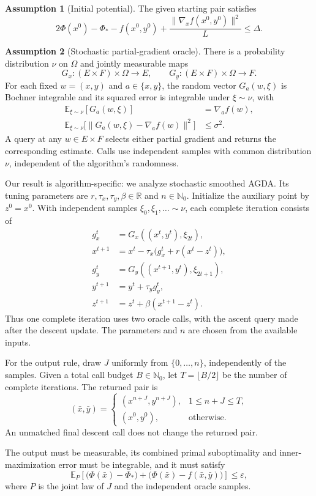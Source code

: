 \documentclass[10pt]{article}
\theoremstyle{definition}
\newtheorem{assumption}{Assumption}
\begin{document}
\begin{assumption}[Initial potential]
The given starting pair satisfies
\[
2\Phi(x^0)-\Phi_*-f(x^0,y^0)
+\frac{\|\nabla_x f(x^0,y^0)\|^2}{L}
\leq\Delta.
\]
\end{assumption}

\begin{assumption}[Stochastic partial-gradient oracle]
There is a probability distribution $\nu$ on $\Omega$ and jointly measurable maps
\[
G_x:(E\times F)\times\Omega\to E,
\qquad
G_y:(E\times F)\times\Omega\to F.
\]
For each fixed $w=(x,y)$ and $a\in\{x,y\}$, the random vector $G_a(w,\xi)$ is Bochner integrable and its squared error is integrable under $\xi\sim\nu$, with
\[
\begin{aligned}
\mathbb{E}_{\xi\sim\nu}[G_a(w,\xi)]&=\nabla_a f(w),\\
\mathbb{E}_{\xi\sim\nu}
\bigl[\|G_a(w,\xi)-\nabla_a f(w)\|^2\bigr]&\leq\sigma^2.
\end{aligned}
\]
A query at any $w\in E\times F$ selects either partial gradient and returns the corresponding estimate. Calls use independent samples with common distribution $\nu$, independent of the algorithm's randomness.
\end{assumption}

Our result is algorithm-specific: we analyze stochastic smoothed AGDA. Its tuning parameters are $r,\tau_x,\tau_y,\beta\in\mathbb{R}$ and $n\in\mathbb{N}_0$. Initialize the auxiliary point by $z^0=x^0$. With independent samples $\xi_0,\xi_1,\ldots\sim\nu$, each complete iteration consists of
\[
\begin{aligned}
g_x^t&=G_x((x^t,y^t),\xi_{2t}),\\
x^{t+1}&=x^t-\tau_x\bigl(g_x^t+r(x^t-z^t)\bigr),\\
g_y^t&=G_y((x^{t+1},y^t),\xi_{2t+1}),\\
y^{t+1}&=y^t+\tau_y g_y^t,\\
z^{t+1}&=z^t+\beta(x^{t+1}-z^t).
\end{aligned}
\]
Thus one complete iteration uses two oracle calls, with the ascent query made after the descent update. The parameters and $n$ are chosen from the available inputs.

For the output rule, draw $J$ uniformly from $\{0,\ldots,n\}$, independently of the samples. Given a total call budget $B\in\mathbb{N}_0$, let $T=\lfloor B/2\rfloor$ be the number of complete iterations. The returned pair is
\[
(\bar{x},\bar{y})=
\begin{cases}
(x^{n+J},y^{n+J}),&1\leq n+J\leq T,\\
(x^0,y^0),&\text{otherwise}.
\end{cases}
\]
An unmatched final descent call does not change the returned pair.

The output must be measurable, its combined primal suboptimality and inner-maximization error must be integrable, and it must satisfy
\[
\mathbb{E}_{P}\!\left[
\bigl(\Phi(\bar{x})-\Phi_*\bigr)
+\bigl(\Phi(\bar{x})-f(\bar{x},\bar{y})\bigr)
\right]\leq\varepsilon,
\]
where $P$ is the joint law of $J$ and the independent oracle samples.
\end{document}
